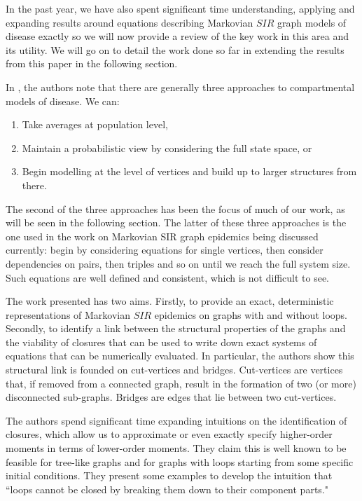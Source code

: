 \documentclass[../report.tex]{subfiles}
\begin{document}
In the past year, we have also spent significant time understanding, applying and expanding results around equations describing Markovian $SIR$ graph models of disease exactly \cite{kiss_2014} so we will now provide a review of the key work in this area and its utility. We will go on to detail the work done so far in extending the results from this paper in the following section.

In \cite{kiss_2014}, the authors note that there are generally three approaches to compartmental models of disease. We can:
\begin{enumerate}
	\item Take averages at population level, 
	\item Maintain a probabilistic view by considering the full state space, or
	\item Begin modelling at the level of vertices and build up to larger structures from there.
\end{enumerate}

The second of the three approaches has been the focus of much of our work, as will be seen in the following section. The latter of these three approaches is the one used in the work on Markovian SIR graph epidemics being discussed currently: begin by considering equations for single vertices, then consider dependencies on pairs, then triples and so on until we reach the full system size. Such equations are well defined and consistent, which is not difficult to see.

The work presented has two aims. Firstly, to provide an exact, deterministic representations of Markovian $SIR$ epidemics on graphs with and without loops. Secondly, to identify a link between the structural properties of the graphs and the viability of closures that can be used to write down exact systems of equations that can be numerically evaluated. In particular, the authors show this structural link is founded on cut-vertices and bridges. Cut-vertices are vertices that, if removed from a connected graph, result in the formation of two (or more) disconnected sub-graphs. Bridges are edges that lie between two cut-vertices.

The authors spend significant time expanding intuitions on the identification of closures, which allow us to approximate or even exactly specify higher-order moments in terms of lower-order moments. They claim this is well known to be feasible for tree-like graphs and for graphs with loops starting from some specific initial conditions. They present some examples to develop the intuition that ``loops cannot be closed by breaking them down to their component parts."
\end{document}
